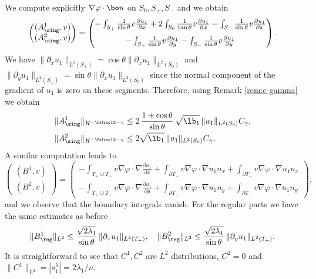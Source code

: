 We compute explicitly $\nabla \varphi \cdot \bo n$ on $S_0,S_+,S_-$ and we obtain
\[
\begin{pmatrix} (A^1_{\sing},v)\\ (A^2_{\sing},v) \end{pmatrix}
=\begin{pmatrix}-\int_{S_+}\frac{1}{\sin\theta} v \frac{\partial u_1}{\partial x}
+2\int_{S_0}\frac{1}{\tan \theta} v \frac{\partial u_1}{\partial x}
-\int_{S_-}\frac{1}{\sin\theta} v \frac{\partial u_1}{\partial x} \\[8pt]
-\int_{S_+}\frac{1}{\sin\theta} v \frac{\partial u_1}{\partial y}
-\int_{S_-}\frac{1}{\sin\theta} v \frac{\partial u_1}{\partial y}
\end{pmatrix}.
\]
We have $\|\partial_x u_1\|_{L^2(S_\pm)} = \cos \theta \|\partial_x u_1\|_{L^2(S_0)}$ and $\|\partial_y u_1\|_{L^2(S_\pm)} = \sin \theta \|\partial_x u_1\|_{L^2(S_0)}$ since the normal component of the gradient of $u_1$ is zero on these segments. Therefore, using Remark \ref{rem:c-gamma} we obtain
\begin{align*}
\|A^1_{\sing}\|_{H^{-\Psfrac 12-\gamma}} &\le 2\, \frac{1+ \cos \theta}{ \sin \theta}\, \sqrt{ \lb_1 }\, \|u_1\|_{L^2(S_0)}C_\gamma, \\
\|A^2_{\sing}\|_{H^{-\Psfrac 12-\gamma}} &\le 2 \sqrt{ \lb_1 }\, \|u_1 \|_{L^2(S_0)}C_\gamma.
\end{align*}
A similar computation leads to
\[
\begin{pmatrix} (B^1,v)\\ (B^2,v) \end{pmatrix} = \begin{pmatrix} - \int_{T_+\cup T_-} v \nabla \varphi \cdot \nabla \frac{\partial u_1 }{\partial x} + \int_{\partial T_+} v \nabla \varphi \cdot \nabla u_1 n_x +\int_{\partial T_-} v \nabla \varphi \cdot \nabla u_1 n_x\\[5pt]
- \int_{T_+\cup T_-} v \nabla \varphi \cdot \nabla \frac{\partial u_1 }{\partial y} +\int_{\partial T_+} v \nabla \varphi \cdot \nabla u_1 n_y +\int_{\partial T_-} v \nabla \varphi \cdot \nabla u_1 n_y \end{pmatrix},
\]
and we observe that the boundary integrals vanish. For the regular parts we have the same estimates as before
\[
\|B^1_{\reg}\|_{L^2} \leq \frac{\sqrt{2\lambda_1}}{\sin \theta}\, \|\partial_x u_1\|_{L^2(T_+)},\quad \|B^2_{\reg}\|_{L^2} \leq \frac{\sqrt{2\lambda_1}}{\sin \theta}\,\|\partial_y u_1\|_{L^2(T_+)}.
\]
It is straightforward to see that $C^1,C^2$ are $L^2$ distributions, $C^2 = 0$ and $\|C^1\|_{L^2} = |s_1^\lambda| = 2\lambda_1/n$.


